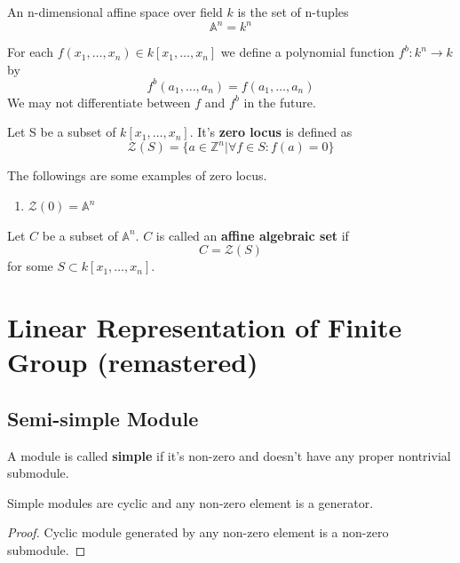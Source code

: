 \documentclass[12pt]{book}
\begin{document}
	An n-dimensional affine space over field $k$ is the set of n-tuples
	\begin{equation}
		\mathbb A^n=k^n
	\end{equation}
	
	For each $f(x_1,\dots,x_n)\in k[x_1,\dots,x_n]$ we define a polynomial function $f^b:k^n\rightarrow k$ by
	\begin{equation}
		f^b(a_1,\dots,a_n)=f(a_1,\dots,a_n)
	\end{equation}
	We may not differentiate between $f$ and $f^b$ in the future.
	
	\begin{definition}
		Let S be a subset of $k[x_1,\dots,x_n]$. It's {\bf zero locus} is defined as
		\begin{equation}
			\mathcal Z(S)=\{a\in \mathbb Z^n |\forall f \in S : f(a)=0\}
		\end{equation}
	\end{definition}
	
	\begin{example}
		The followings are some examples of zero locus.
		\begin{enumerate}
			\item $\mathcal Z(0)=\mathbb A^n$
		\end{enumerate}
	\end{example}
	
	\begin{definition}
		Let $C$ be a subset of $\mathbb A^n$. $C$ is called an {\bf affine algebraic set} if
		\begin{equation}
			C=\mathcal Z(S)
		\end{equation}
		for some $S\subset k[x_1,\dots,x_n]$.
	\end{definition}
	\chapter{Linear Representation of Finite Group (remastered)}
	
	\section{Semi-simple Module}
	
	\begin{definition}
		A module is called {\bf simple} if it's non-zero and doesn't have any proper nontrivial submodule.
	\end{definition}
	
	\begin{theorem}
		Simple modules are cyclic and any non-zero element is a generator.
	\end{theorem}
	\begin{proof}
		Cyclic module generated by any non-zero element is a non-zero submodule.
	\end{proof}
	
\end{document}
